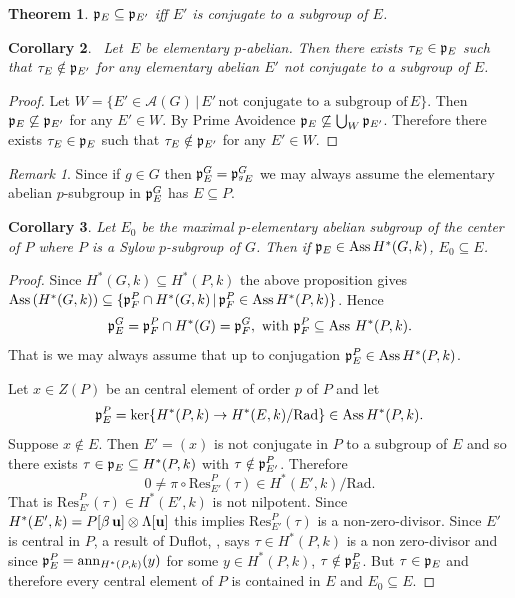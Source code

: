 \documentclass[reqno]{amsart}
\theoremstyle{plain}%
\newtheorem{thm}{Theorem}[section]
\newtheorem{cor}[thm]{Corollary}
\theoremstyle{definition}
\theoremstyle{remark}
\newtheorem{remark}{Remark}
\newcommand\vv{\,\vert\,}
\newcommand\sub{\subseteq}
\newcommand\as{\text{Ass}\,}
\begin{document}
\begin{thm}\cite{Q} $\frak p_E\sub \frak p_{E'}$ iff $E'$ is conjugate to a subgroup of $E$. \end{thm}

\begin{cor}\ Let \,$E$ be elementary $p$-abelian.  Then there exists $\tau_E\in\frak p_E$ such that $\tau_{E}\notin\frak p_{E'}$ for any elementary abelian $E'$ not conjugate to a subgroup of $E$.\end{cor}
\begin{proof} Let $W=\{E'\in\mathcal A(G)\vv E'\,\text{not conjugate to a subgroup of}\,E\}$. Then $\frak p_E\not\subseteq \frak p_{E'}$ for any $E'\in W$.  By Prime Avoidence $\frak p_E\not\subseteq\bigcup_W\frak p_{E'}$.  Therefore there exists $\tau_E\in\frak p_E$ such that $\tau_{E}\notin\frak p_{E'}$ for any $E'\in W$. \end{proof} 

\begin{remark} Since if $g \in G$ then $\frak p^G_E=\frak p^G_{{}^gE}$ we may always assume the elementary abelian $p$-subgroup in $\frak p^G_E$ has $E\sub P$.
\end{remark}

\begin{cor}\label{fine} Let $E_0$ be the maximal $p$-elementary abelian subgroup of the center of $P$ where $P$ is a Sylow $p$-subgroup of $G$.  Then if $\frak p_E\in\as H^*(G,k)$, $E_0\sub E$.\end{cor}
\begin{proof} Since $H^*(G,k)\sub H^*(P,k)$ the above proposition gives $\as(H^*(G,k))\sub\{\frak p^P_F\cap H^*(G,k)\vv \frak p^P_F\in\as H^*(P,k)\}$.  Hence 
$$\frak p^G_E=\frak p^P_F\cap H^*(G)=\frak p^G_F, \text{ with } \frak p^P_F\sub \as\,H^*(P,k).$$
That is we may always assume that up to conjugation $\frak p^P_E\in\as H^*(P,k)$.  

Let $x\in Z(P)$ be an central element of order $p$ of $P$ and let 
$$\frak p^P_E=\ker\{H^*(P,k)\to H^*(E,k)/\text{Rad}\}\in\as H^*(P,k).$$  Suppose $x\notin E$. Then $E'=(x)$ is not conjugate in $P$ to a subgroup of $E$ and so there exists $\tau\in\frak p_E\sub H^*(P,k)$ with $\tau\notin\frak p^P_{E'}$.  Therefore 
$$0\neq\pi\circ\text{Res}^P_{E'}(\tau)\in H^*(E',k)/\text{Rad}. $$  That is $\text{Res}^P_{E'}(\tau)\in H^*(E',k)$ is not nilpotent.  Since $H^*(E',k)=P[\beta\,\bold u]\otimes \Lambda[\bold u]$ this implies $\text{Res}^P_{E'}(\tau)$ is a non-zero-divisor. Since $E'$ is central in $P$, a result of Duflot, \cite{D}, says $\tau\in H^*(P,k)$ is a non zero-divisor and since $\frak p^P_E=\text{ann}_{H^*(P,k)}(y)$ for some $y\in H^*(P,k)$, $\tau\notin\frak p^P_E$. But $\tau\in \frak p_E$ and therefore every central element of $P$ is contained in $E$ and $E_0\sub E$.
\end{proof}
\end{document}
